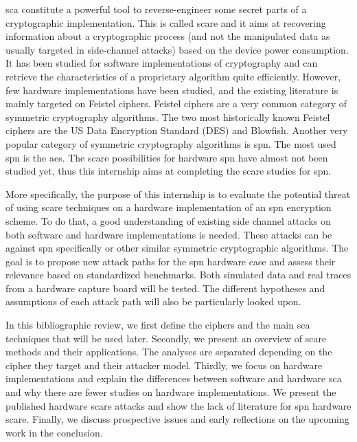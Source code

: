 \documentclass[11pt]{sdm}
\begin{document}
\gls{sca} constitute a powerful tool to reverse-engineer some secret parts of a cryptographic implementation.
This is called \acrfull{scare} and it aims at recovering information about a cryptographic process (and not the manipulated data as usually targeted in side-channel attacks) based on the device power consumption.
It has been studied for software implementations of cryptography and can retrieve the characteristics of a proprietary algorithm quite efficiently. %
However, few hardware implementations have been studied, and the existing literature is mainly targeted on Feistel ciphers.
Feistel ciphers are a very common category of symmetric cryptography algorithms.
The two most historically known Feistel ciphers are the US Data Encryption Standard (DES) and Blowfish. %
Another very popular category of symmetric cryptography algorithms is \acrfull{spn}.
The most used \gls{spn} is the \acrfull{aes}. %
The \gls{scare} possibilities for hardware \gls{spn} have almost not been studied yet, thus this internship aims at completing the \gls{scare} studies for \gls{spn}.

More specifically, the purpose of this internship is to evaluate the potential threat of using \gls{scare} techniques on a hardware implementation of an \gls{spn} encryption scheme.
To do that, a good understanding of existing side channel attacks on both software and hardware implementations is needed.
These attacks can be against \gls{spn} specifically or other similar symmetric cryptographic algorithms.
The goal is to propose new attack paths for the \gls{spn} hardware case and assess their relevance based on standardized benchmarks.
Both simulated data and real traces from a hardware capture board will be tested.
The different hypotheses and assumptions of each attack path will also be particularly looked upon.

In this bibliographic review, we first define the ciphers and the main \gls{sca} techniques that will be used later.
Secondly, we present an overview of \gls{scare} methods and their applications.
The analyses are separated depending on the cipher they target and their attacker model.
Thirdly, we focus on hardware implementations and explain the differences between software and hardware \gls{sca} and why there are fewer studies on hardware implementations.
We present the published hardware \gls{scare} attacks and show the lack of literature for \gls{spn} hardware \gls{scare}.
Finally, we discuss prospective issues and early reflections on the upcoming work in the conclusion.
\end{document}
